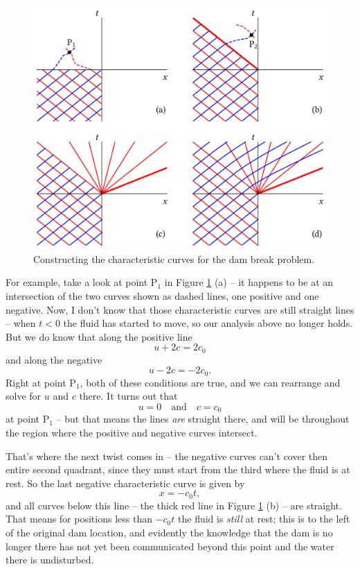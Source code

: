 \begin{figure}
\centering
\includegraphics[width=\linewidth]{Figures/Chapter6/fig_char_curves}
\caption{Constructing the characteristic curves for the dam break problem. }
\label{fig_char_curves}
\end{figure}

For example, take a look at point P$_1$ in Figure \ref{fig_char_curves} (a) -- it happens to be at an intersection of the two curves shown as dashed lines, one positive and one negative.  Now, I don't know that those characteristic curves are still straight lines -- when $t<0$ the fluid has started to move, so our analysis above no longer holds.  But we do know that along the positive line 
\[
u + 2c = 2c_0
\]
and along the negative
\[
u - 2c = -2c_0.
\]
Right at point P$_1$, both of these conditions are true, and we can rearrange and solve for $u$ and $c$ there.  It turns out that
\[
u = 0 \quad \text{and} \quad c = c_0
\]
at point P$_1$ -- but that means the lines \emph{are} straight there, and will be throughout the region where the positive and negative curves intersect.

That's where the next twist comes in -- the negative curves can't cover then entire second quadrant, since they must start from the third where the fluid is at rest.  So the last negative characteristic curve is given by
\[
x = -c_0 t,
\]
and all curves below this line -- the thick red line in Figure \ref{fig_char_curves} (b) -- are straight.  That means for positions less than $-c_0 t$ the fluid is \emph{still} at rest; this is to the left of the original dam location, and evidently the knowledge that the dam is no longer there has not yet been communicated beyond this point and the water there is undisturbed.

